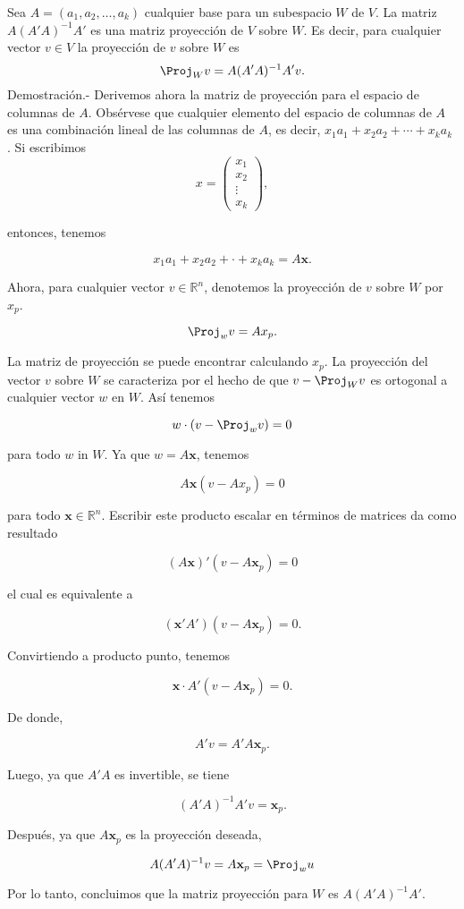 \begin{teo}
    Sea $A=(a_1,a_2,\ldots,a_k)$ cualquier base para un subespacio $W$ de $V$. La matriz $A(A'A)^{-1}A'$ es una matriz proyección de $V$ sobre $W$. Es decir, para cualquier vector $v\in V$ la proyección de $v$ sobre $W$ es
    \begin{equation}
	\Proj_W v=A(A'A)^{-1}A'v.
    \end{equation}
	Demostración.-\; Derivemos ahora la matriz de proyección para el espacio de columnas de $A$. Obsérvese que cualquier elemento del espacio de columnas de $A$ es una combinación lineal de las columnas de $A$, es decir, $x_1 a_1 + x_2 a_2 + \cdots + x_k a_k$ . Si escribimos
	$$
	x=
	\left(
	    \begin{array}{c}
		x_1\\
		x_2\\
		\vdots\\
		x_k
	    \end{array}
	\right),
	$$

	entonces, tenemos

	$$x_1a_1+x_2a_2+\cdot + x_ka_k=A\textbf{x}.$$

	Ahora, para cualquier vector $v\in \mathbb{R}^n$, denotemos la proyección de $v$ sobre $W$ por $x_p$.

	$$\Proj_w v = Ax_p.$$

	La matriz de proyección se puede encontrar calculando $x_p$. La proyección del vector $v$ sobre $W$ se caracteriza por el hecho de que $v - \Proj_W v$ es ortogonal a cualquier vector $w$ en $W$. Así tenemos

	$$w\cdot (v-\Proj_w v)=0$$

	para todo $w$ in $W$. Ya que $w=A\textbf{x}$, tenemos

	$$A\textbf{x}(v-Ax_p)=0$$

	para todo $\textbf{x}\in \mathbb{R}^n$. Escribir este producto escalar en términos de matrices da como resultado

	$$(A\textbf{x})'(v-A\textbf{x}_p)=0$$

	el cual es equivalente a

	$$(\textbf{x}'A')(v-A\textbf{x}_p)=0.$$

	Convirtiendo a producto punto, tenemos

	$$\textbf{x}\cdot A'(v-A\textbf{x}_p)=0.$$

	De donde,

	$$A'v=A'A\textbf{x}_p.$$

	Luego, ya que $A'A$ es invertible, se tiene

	$$(A'A)^{-1}A'v = \textbf{x}_p.$$

	Después, ya que $A\textbf{x}_p$ es la proyección deseada,

	$$A(A'A)^{-1}v=A\textbf{x}_p=\Proj_w u$$

	Por lo tanto, concluimos que la matriz proyección para $W$ es $A(A'A)^{-1}A'.$
\end{teo}

